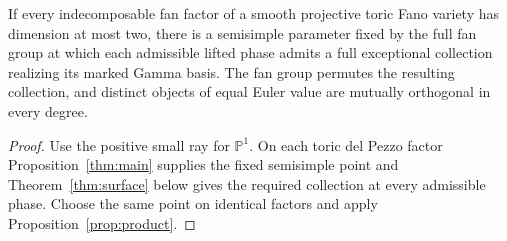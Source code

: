 \begin{corollary}\label{cor:surfaceproducts}
If every indecomposable fan factor of a smooth projective toric Fano variety has dimension at most two, there is a semisimple parameter fixed by the full fan group at which each admissible lifted phase admits a full exceptional collection realizing its marked Gamma basis. The fan group permutes the resulting collection, and distinct objects of equal Euler value are mutually orthogonal in every degree.
\end{corollary}
\begin{proof}
Use the positive small ray for $\mathbb P^1$. On each toric del Pezzo factor Proposition~\ref{thm:main} supplies the fixed semisimple point and Theorem~\ref{thm:surface} below gives the required collection at every admissible phase. Choose the same point on identical factors and apply Proposition~\ref{prop:product}.
\end{proof}
